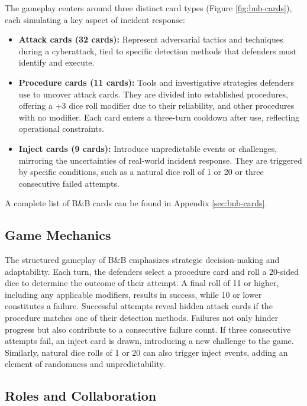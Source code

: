 \documentclass[letterpaper]{article} %
\begin{document}
The gameplay centers around three distinct card types (Figure \ref{fig:bnb-cards}), each simulating a key aspect of incident response:
\begin{itemize}
    \item \textbf{Attack cards (32 cards):} Represent adversarial tactics and techniques during a cyberattack, tied to specific detection methods that defenders must identify and execute.

    \item \textbf{Procedure cards (11 cards):} Tools and investigative strategies defenders use to uncover attack cards. They are divided into established procedures, offering a +3 dice roll modifier due to their reliability, and other procedures with no modifier. Each card enters a three-turn cooldown after use, reflecting operational constraints.

    \item \textbf{Inject cards (9 cards):} Introduce unpredictable events or challenges, mirroring the uncertainties of real-world incident response. They are triggered by specific conditions, such as a natural dice roll of 1 or 20 or three consecutive failed attempts.
\end{itemize}
A complete list of B\&B cards can be found in Appendix \ref{sec:bnb-cards}.

\subsection{Game Mechanics}

The structured gameplay of B\&B emphasizes strategic decision-making and adaptability. Each turn, the defenders select a procedure card and roll a 20-sided dice to determine the outcome of their attempt. A final roll of 11 or higher, including any applicable modifiers, results in success, while 10 or lower constitutes a failure. Successful attempts reveal hidden attack cards if the procedure matches one of their detection methods. Failures not only hinder progress but also contribute to a consecutive failure count. If three consecutive attempts fail, an inject card is drawn, introducing a new challenge to the game. Similarly, natural dice rolls of 1 or 20 can also trigger inject events, adding an element of randomness and unpredictability.

\subsection{Roles and Collaboration}
\end{document}
